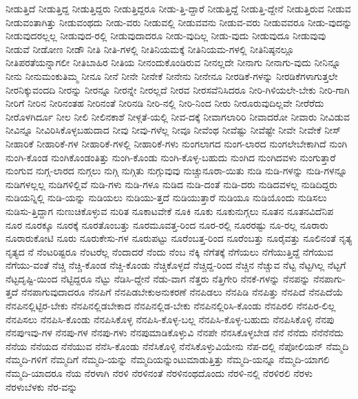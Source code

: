 {ನೀಡುತ್ತಿದೆ
ನೀಡುತ್ತಿದ್ದ
ನೀಡುತ್ತಿದ್ದರು
ನೀಡುತ್ತಿದ್ದರೂ
ನೀಡು-ತ್ತಿ-ದ್ದಾರೆ
ನೀಡುತ್ತಿದ್ದೆ
ನೀಡುತ್ತಿ-ದ್ದೇನೆ
ನೀಡುತ್ತಿರುವ
ನೀಡುವ
ನೀಡುವಂತಾಗಿತ್ತು
ನೀಡುವಂಥದು
ನೀಡು-ವರು
ನೀಡುವಲ್ಲಿ
ನೀಡುವವನು
ನೀಡುವ-ವರು
ನೀಡುವವರೂ
ನೀಡು-ವುದನ್ನು
ನೀಡುವುದರಲ್ಲಲ್ಲ
ನೀಡುವುದ-ರಲ್ಲಿ
ನೀಡುವುದಾದರೂ
ನೀಡು-ವುದಿಲ್ಲ
ನೀಡು-ವುದು
ನೀಡುವುದೂ
ನೀಡುವುವು
ನೀಡುವೆ
ನೀಡೋಣ
ನೀಡೌ
ನೀತಿ
ನೀತಿ-ಗಳಲ್ಲಿ
ನೀತಿನಿಯಮಕ್ಕೆ
ನೀತಿನಿಯಮ-ಗಳಲ್ಲಿ
ನೀತಿನಿಷ್ಠನಲ್ಲೂ
ನೀತಿಪರತೆಯನ್ನಾಗಲೀ
ನೀತಿಬಾಹಿರ
ನೀತಿಯ
ನೀನಂದುಕೊಂಡಿರುವ
ನೀನಲ್ಲದೇ
ನೀನಾಗು
ನೀನಾಗು-ವುದು
ನೀನಿನ್ನೂ
ನೀನು
ನೀನುಮಂಕುತಿಮ್ಮ
ನೀನೂ
ನೀನೆ
ನೀನೇ
ನೀನೇಕೆ
ನೀನೇನು
ನೀನೇನೂ
ನೀರಡಿಕೆ-ಗಳನ್ನು
ನೀರಡಿಕೆಗಳಾಗುತ್ತಲೇ
ನೀರನಿಕ್ಕುವಂದದಿ
ನೀರನ್ನು
ನೀರನ್ನೂ
ನೀರನ್ನೇ
ನೀರಲ್ಲದೆ
ನೀರವ
ನೀರಸವೆನಿಸಿದರೂ
ನೀರಿ-ಗಿಳಿಯಲೇ-ಬೇಕು
ನೀರಿ-ಗಾಗಿ
ನೀರಿಗೆ
ನೀರಿನ
ನೀರಿನಂತಹ
ನೀರಿನಂತೆ
ನೀರಿನಡಿ
ನೀರಿ-ನಲ್ಲಿ
ನೀರಿ-ನಿಂದ
ನೀರು
ನೀರೂರುವುದಿಲ್ಲವೇ
ನೀರೆರೆದು
ನೀರೊಳಗಿರ್ದೂ
ನೀಲ
ನೀಲಿ
ನೀಲಿನಕಾಶೆ
ನೀಳ್ಗತೆ-ಯಲ್ಲಿ
ನೀವ-ದಕ್ಕೆ
ನೀವಾಗಲಾರಿರಿ
ನೀವಾದರೋ
ನೀವಾರು
ನೀವಿಡುವ
ನೀವಿನ್ನೂ
ನೀವಿರಿಸಿಕೊಳ್ಳಬಹುದಾದ
ನೀವು
ನೀವು-ಗಳೆಲ್ಲ
ನೀವೂ
ನೀವೆಂಥ
ನೀವೆಷ್ಟು
ನೀವೆಷ್ಟೇ
ನೀವೇ
ನೀವೇಕೆ
ನೀಸ್
ನೀಹಾರಿಕೆ
ನೀಹಾರಿಕೆ-ಗಳ
ನೀಹಾರಿಕೆ-ಗಳಲ್ಲಿ
ನೀಹಾರಿಕೆ-ಗಳು
ನುಂಗಲಾಗದ
ನುಂಗ-ಲಾರದ
ನುಂಗಲೇಬೇಕಾಗಿದೆ
ನುಂಗಿ
ನುಂಗಿ-ಕೊಂಡ
ನುಂಗಿಕೊಂಡಂತಿತ್ತು
ನುಂಗಿ-ಕೊಂಡು
ನುಂಗಿ-ಕೊಳ್ಳ-ಬಹುದು
ನುಂಗಿದ
ನುಂಗಿದವಳು
ನುಂಗುತ್ತಾರೆ
ನುಂಗುವ
ನುಗ್ಗ-ಲಾರದ
ನುಗ್ಗಲು
ನುಗ್ಗಿ
ನುಗ್ಗಿತು
ನುಗ್ಗುವುವು
ನುಚ್ಚುನೂರಾ-ಯಿತು
ನುಡಿ
ನುಡಿ-ಗಳನ್ನು
ನುಡಿ-ಗಳನ್ನೂ
ನುಡಿಗಳಲ್ಲಲ್ಲ
ನುಡಿಗಳಿಲ್ಲಿವೆ
ನುಡಿ-ಗಳು
ನುಡಿ-ಗಳೂ
ನುಡಿದ
ನುಡಿ-ದಂತೆ
ನುಡಿ-ದರು
ನುಡಿದವಳಲ್ಲ
ನುಡಿದಿದ್ದರು
ನುಡಿಯನ್ನಿಲ್ಲಿ
ನುಡಿ-ಯನ್ನು
ನುಡಿಯಲು
ನುಡಿಯು-ತ್ತದೆ
ನುಡಿಯುತ್ತಾರೆ
ನುಡಿಯೂ
ನುಡಿಯೊಂದು
ನುಡಿಸಲು
ನುಡಿಸು-ತ್ತಿದ್ದಾಗ
ನುಣುಚಿಕೊಳ್ಳುವ
ನುರಿತ
ನೂಕಾಟವೇಕೆ
ನೂಕಿ
ನೂಕು
ನೂಕುನುಗ್ಗಲು
ನೂತನ
ನೂತನವಿದೆನಿಪ
ನೂರ
ನೂರಕ್ಕೂ
ನೂರಕ್ಕೆ
ನೂರತೊಂಬತ್ತು
ನೂರಮೂವತ್ತ-ರಿಂದ
ನೂರ-ರಲ್ಲಿ
ನೂರರಷ್ಟು
ನೂ-ರಲ್ಲ
ನೂರಾರು
ನೂರಾರುಕೋಟಿ
ನೂರು
ನೂರುಕೇಸು-ಗಳ
ನೂರುಪಟ್ಟು
ನೂರೆಂಬತ್ತ-ರಿಂದ
ನೂರೆಂಬತ್ತು
ನೂರೈವತ್ತು
ನೂಲಿನಂತೆ
ನೃತ್ಯ
ನೃತ್ಯದ
ನೆ
ನೆಂಟರಿಷ್ಟರೂ
ನೆಂಟರೆಲ್ಲ
ನೆಂದಾದರೆ
ನೆಂದು
ನೆಂಬ
ನೆಕ್ಕಿ
ನೆಗೆತಕ್ಕೆ
ನೆಗೆಯಲು
ನೆಗೆಯುತ್ತಿದ್ದೆ
ನೆಗೆಯುವ
ನೆಗೆಯು-ವಂತೆ
ನೆಚ್ಚಿ
ನೆಚ್ಚಿ-ಕೊಂಡ
ನೆಚ್ಚಿ-ಕೊಂಡು
ನೆಚ್ಚಿಕೊಳ್ಳದೆ
ನೆಚ್ಚಿದ್ದ-ರಿಂದ
ನೆಚ್ಚಿನ
ನೆಚ್ಚುವ
ನೆಟ್ಟ
ನೆಟ್ಟಗಿಲ್ಲ
ನೆಟ್ಟಗೆ
ನೆಟ್ಟದೃಷ್ಟಿ-ಯಿಂದ
ನೆಟ್ಟಿದ್ದರೂ
ನೆಟ್ಟು
ನೆಡಿಸಿ-ದ್ದೇನೆ
ನೆಡು-ವಾಗ
ನೆತ್ತರು
ನೆತ್ತಿಗೇರಿ
ನೆನಕೆ-ಗಳನ್ನು
ನೆನಪನ್ನು
ನೆನಪಾಗು-ತ್ತದೆ
ನೆನಪಾಗುವುದಾದರೂ
ನೆನಪಿಗೆ
ನೆನಪಿಡಬೇಕುಅನುಕರಣೆ
ನೆನಪಿಡಲು
ನೆನಪಿಡಿ
ನೆನಪಿತ್ತು
ನೆನಪಿದೆ
ನೆನಪಿದೆಯೆ
ನೆನಪಿನಲ್ಲಿಟ್ಟಿರ-ಬೇಕು
ನೆನಪಿನಲ್ಲಿಡಬೇಕಾದ
ನೆನಪಿನಲ್ಲಿಡ-ಬೇಕು
ನೆನಪಿನಲ್ಲಿರಿಸಿ-ಕೊಂಡು
ನೆನಪಿರಲಿ
ನೆನಪಿರ-ಲಿಲ್ಲ
ನೆನಪಿಸಲು
ನೆನಪಿಸಿ-ಕೊಂಡು
ನೆನಪಿಸಿಕೊಳ್ಳ
ನೆನಪಿಸಿ-ಕೊಳ್ಳ-ಬಲ್ಲ
ನೆನಪಿಸಿ-ಕೊಳ್ಳ-ಬಹುದು
ನೆನಪಿಸಿಕೊಳ್ಳಿ
ನೆನಪು
ನೆನಪುಇವು-ಗಳ
ನೆನಪು-ಗಳ
ನೆನಪು-ಗಳು
ನೆನಪುಮಾಡಿಕೊಳ್ಳುವಿ
ನೆನಪೇ
ನೆನಸಿಕೊಳ್ಳಬೇಡ
ನೆನೆ
ನೆನೆದು
ನೆನೆನೆನೆದು
ನೆನೆಯ
ನೆನೆಯದ
ನೆನೆಯುವ
ನೆನೆಸಿ-ಕೊಂಡು
ನೆನೆಸಿಕೊಳ್ಳಿ
ನೆನೆಸಿಕೊಳ್ಳುವಿಯೇನು
ನೆಪ-ದಲ್ಲಿ
ನೆಪೋಲಿಯನ್
ನೆಮ್ಮದಿ
ನೆಮ್ಮದಿ-ಗಳಿಗೆ
ನೆಮ್ಮದಿಗೆ
ನೆಮ್ಮದಿ-ಯನ್ನು
ನೆಮ್ಮದಿಯನ್ನುಂಟುಮಾಡುತ್ತಿತ್ತು
ನೆಮ್ಮದಿ-ಯನ್ನೂ
ನೆಮ್ಮದಿ-ಯಾಗಲಿ
ನೆಮ್ಮದಿ-ಯಾದರೂ
ನೆಯ
ನೆರಳಾಗಿ
ನೆರಳಿ
ನೆರಳಿನಂತೆ
ನೆರಳಿನಂಥದೊಂದು
ನೆರಳಿ-ನಲ್ಲಿ
ನೆರಳಿರಲಿ
ನೆರಳು
ನೆರಳುಬೆಳಕು
ನೆರ-ವನ್ನು
}
